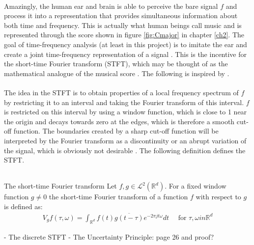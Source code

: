 \\
Amazingly, the human ear and brain is able to perceive the bare signal $f$ and process it into a representation that provides simultaneous information about both time and frequency. This is actually what human beings call music and is represented through the score shown in figure \ref{fig:Cmajor} in chapter \ref{ch2}. The goal of time-frequency analysis (at least in this project) is to imitate the ear and create a joint time-frequency representation of a signal \cite{page 22, FTFA}. This is the incentive for the short-time Fourier transform (STFT), which may be thought of as the mathematical analogue of the musical score \cite{page 37, FTFA}. The following is inspired by \cite{page 37, FTFA}.
\\ \\
The idea in the STFT is to obtain properties of a local frequency spectrum of $f$ by restricting it to an interval and taking the Fourier transform of this interval. $f$ is restricted on this interval by using a window function, which is close to 1 near the origin and decays towards zero at the edges, which is therefore a smooth cut-off function. The boundaries created by a sharp cut-off function will be interpreted by the Fourier transform as a discontinuity or an abrupt variation of the signal, which is obviously not desirable \cite{Davis}. The following definition defines the STFT.
\\ \\
\begin{definition}{The short-time Fourier transform}
Let $f,g \in \mathcal{L}^2(\mathbb{R}^d)$. For a fixed window function $g \neq 0$ the short-time Fourier transform of a function $f$ with respect to $g$ is defined as:
\begin{align}
V_gf(\tau,\omega) = \int_{\mathbb{R}^d} f(t) \overline{g(t - \tau)} e^{-2\pi j t \omega} dt \quad \text{ for } \tau,\omega in \mathbb{R}^d
\end{align}
\end{definition}

- The discrete STFT
- The Uncertainty Principle: page 26 and proof?